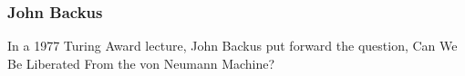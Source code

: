 \begin{frame}
\frametitle{John Backus}
\begin{center}
 In a 1977 Turing Award lecture, John Backus put forward the question, Can We Be Liberated From the von Neumann Machine?\cite{backus1978can}
\end{center}
\end{frame}
